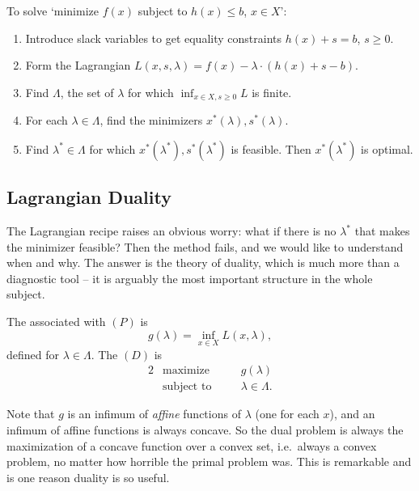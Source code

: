 \documentclass[a4paper]{scrartcl}
\begin{document}
\begin{remark}
    To solve `minimize $f(x)$ subject to $h(x) \leq b$, $x \in X$':
    \begin{enumerate}[label=(\arabic*)]
        \item Introduce slack variables to get equality constraints $h(x) + s = b$, $s \geq 0$.
        \item Form the Lagrangian $L(x, s, \lambda) = f(x) - \lambda\cdot(h(x) + s - b)$.
        \item Find $\Lambda$, the set of $\lambda$ for which $\inf_{x \in X, s \geq 0}L$ is finite.
        \item For each $\lambda \in \Lambda$, find the minimizers $x^*(\lambda), s^*(\lambda)$.
        \item Find $\lambda^* \in \Lambda$ for which $x^*(\lambda^*), s^*(\lambda^*)$ is feasible. Then $x^*(\lambda^*)$ is optimal.
    \end{enumerate}
\end{remark}

\subsection{Lagrangian Duality}

The Lagrangian recipe raises an obvious worry: what if there is no $\lambda^*$ that makes the minimizer feasible? Then the method fails, and we would like to understand when and why. The answer is the theory of duality, which is much more than a diagnostic tool -- it is arguably the most important structure in the whole subject.

\begin{definition}
    The  associated with $(P)$ is
    $$
    g(\lambda) = \inf_{x \in X}L(x, \lambda),
    $$
    defined for $\lambda \in \Lambda$. The  $(D)$ is
    \begin{alignat*}{2}
        & \text{maximize} \quad && g(\lambda) \\
        & \text{subject to} \quad && \lambda \in \Lambda.
    \end{alignat*}
\end{definition}

Note that $g$ is an infimum of \emph{affine} functions of $\lambda$ (one for each $x$), and an infimum of affine functions is always concave. So the dual problem is always the maximization of a concave function over a convex set, i.e.\ always a convex problem, no matter how horrible the primal problem was. This is remarkable and is one reason duality is so useful.
\end{document}
